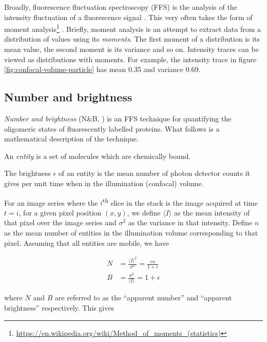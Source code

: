 \documentclass[12pt,]{book}
\let\rmarkdownfootnote\footnote%
\def\footnote{\protect\rmarkdownfootnote}
\theoremstyle{definition}
\theoremstyle{definition}
\theoremstyle{definition}
\theoremstyle{remark}
\let\BeginKnitrBlock\begin \let\EndKnitrBlock\end
\begin{document}
Broadly, fluorescence fluctuation spectroscopy (FFS) is the analysis of
the intensity fluctuation of a fluorescence signal \citep{FFS}. This
very often takes the form of moment analysis\footnote{\url{https://en.wikipedia.org/wiki/Method_of_moments_(statistics)}}
\citep{QianElson}. Briefly, moment analysis is an attempt to extract
data from a distribution of values using its \emph{moments}. The first
moment of a distribution is its mean value, the second moment is its
variance and so on. Intensity traces can be viewed as distributions with
moments. For example, the intensity trace in figure
\ref{fig:confocal-volume-particle} has mean 0.35 and variance 0.69.

\subsection{Number and brightness}\label{number-and-brightness}

\emph{Number and brightness} (N\&B, \citet{NB}) is an FFS technique for
quantifying the oligomeric states of fluorescently labelled proteins.
What follows is a mathematical description of the technique.

\BeginKnitrBlock{definition}
\protect\hypertarget{def:unnamed-chunk-5}{}{\label{def:unnamed-chunk-5} }An
\emph{entity} is a set of molecules which are chemically bound.
\EndKnitrBlock{definition}

\BeginKnitrBlock{definition}
\protect\hypertarget{def:unnamed-chunk-6}{}{\label{def:unnamed-chunk-6} }The
brightness \(\epsilon\) of an entity is the mean number of photon
detector counts it gives per unit time when in the illumination
(confocal) volume.
\EndKnitrBlock{definition} For an image series where the
\(i\)\textsuperscript{th} slice in the stack is the image acquired at
time \(t = i\), for a given pixel position \((x, y)\), we define
\(\langle I \rangle\) as the mean intensity of that pixel over the image
series and \(\sigma^2\) as the variance in that intensity. Define \(n\)
as the mean number of entities in the illumination volume corresponding
to that pixel. Assuming that all entities are mobile, we have

\begin{align}
N &= \frac{\langle I \rangle^2}{\sigma^2} = \frac{\epsilon n}{1 + \epsilon} \label{eq:NB1-1} \\
B &= \frac{\sigma^2}{\langle I \rangle} = 1 + \epsilon \label{eq:NB1-2}
\end{align}

where \(N\) and \(B\) are referred to as the ``apparent number'' and
``apparent brightness'' respectively. This gives
\end{document}
